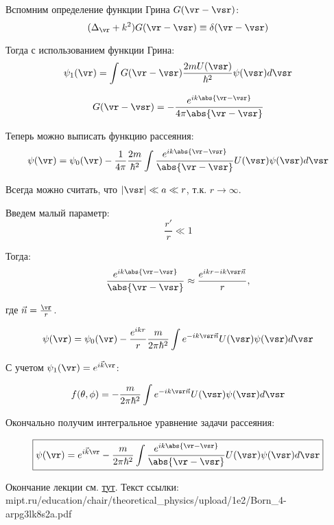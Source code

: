 Вспомним определение функции Грина $G(\vr - \vsr)$:
\begin{equation}
\label{eq:19_3_1}
(\Delta_{\vr} + k^2)G(\vr - \vsr) \equiv \delta(\vr - \vsr)
\end{equation}

Тогда с использованием функции Грина:
$$
\psi_1(\vr) = \int G(\vr - \vsr) \frac{2mU(\vsr)}{\hbar^2} \psi(\vsr) d\vsr
$$

$$
G(\vr - \vsr) = - \frac{e^{ik\abs{\vr - \vsr}}}{4\pi\abs{\vr - \vsr}}
$$

Теперь можно выписать функцию рассеяния:
$$
\psi(\vr) = \psi_0(\vr) - \frac{1}{4 \pi}\frac{2m}{\hbar^2}\int \frac{e^{ik\abs{\vr - \vsr}}}{\abs{\vr - \vsr}} U(\vsr)\psi(\vsr)d\vsr
$$

Всегда можно считать, что $|\vsr| \ll a \ll r$, т.к. $r \to \infty$.

Введем малый параметр:
$$
\frac{r'}{r} \ll 1
$$

Тогда:
$$
\frac{e^{ik\abs{\vr - \vsr}}}{\abs{\vr - \vsr}} \approx \frac{e^{ikr - ik\vsr \vec{n}}}{r},
$$

где $\vec{n} = \frac{\vr}{r}$.

$$
\psi(\vr) = \psi_0(\vr) - \frac{e^{ikr}}{r}\frac{m}{2\pi\hbar^2}\int e^{- ik\vsr \vec{n}} U(\vsr)\psi(\vsr)d\vsr
$$

С учетом $\psi_1(\vr) = e^{i\vec{k}\vr}$:

$$
f(\theta, \phi) =  - \frac{m}{2\pi\hbar^2}\int e^{- ik\vsr \vec{n}} U(\vsr)\psi(\vsr)d\vsr
$$

Окончально получим интегральное уравнение задачи рассеяния:

\begin{equation}
\label{eq:19_3_2}
\boxed{\psi(\vr) = e^{i\vec{k}\vr} - \frac{m}{2\pi\hbar^2}\int \frac{e^{ik\abs{\vr - \vsr}}}{\abs{\vr - \vsr}} U(\vsr)\psi(\vsr)d\vsr}
\end{equation}

Окончание лекции см. \href{http://mipt.ru/education/chair/theoretical_physics/upload/1e2/Born_4-arpg3lk8s2a.pdf}{тут}. Текст ссылки: \\
mipt.ru/education/chair/theoretical\_physics/upload/1e2/Born\_4-arpg3lk8s2a.pdf
